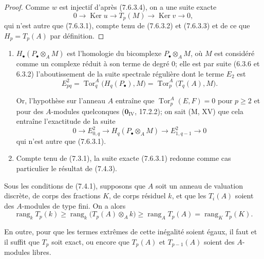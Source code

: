 \begin{proof}
Comme $w$ est injectif d'après (7.6.3.4), on a une suite exacte
\[
  0\longrightarrow\operatorname{Ker}u
  \longrightarrow T_p(M)
  \longrightarrow\operatorname{Ker}v
  \longrightarrow0,
\]
qui n'est autre que (7.6.3.1), compte tenu de (7.6.3.2) et (7.6.3.3) et de ce
que $H_p=T_p(A)$ par définition.
\end{proof}

\begin{remarks}[7.6.4]
\begin{enumerate}
  \item[(i)] $H_\bullet(P_\bullet\otimes_A M)$ est l'homologie du bicomplexe
    $P_\bullet\otimes_A M$, où $M$ est considéré comme un complexe réduit à son
    terme de degré 0; elle est par suite (6.3.6 et 6.3.2) l'aboutissement de la
    suite spectrale régulière dont le terme $E_2$ est
    \[
      E^2_{pq}
      =
      \operatorname{Tor}_q^A\bigl(H_q(P_\bullet),M\bigr)
      =
      \operatorname{Tor}_p^A\bigl(T_q(A),M\bigr).
    \]

    Or, l'hypothèse sur l'anneau $A$ entraîne que
    $\operatorname{Tor}_p^A(E,F)=0$ pour $p\geq2$ et pour des $A$-modules
    quelconques ($\mathbf{0}_{\mathrm{IV}}$, 17.2.2); on sait (M, XV) que cela entraîne
    l'exactitude de la suite
    \[
      0\longrightarrow E^2_{0,q}
      \longrightarrow H_q(P_\bullet\otimes_A M)
      \longrightarrow E^2_{1,q-1}
      \longrightarrow0
    \]
    qui n'est autre que (7.6.3.1).
  \item[(ii)] Compte tenu de (7.3.1), la suite exacte (7.6.3.1) redonne comme
    cas particulier le résultat de (7.4.3).
\end{enumerate}
\end{remarks}

\begin{corollary}[7.6.5]
Sous les conditions de \textup{(7.4.1)}, supposons que $A$ soit un anneau de valuation
discrète, de corps des fractions $K$, de corps résiduel $k$, et que les $T_i(A)$
soient des $A$-modules de type fini. On a alors
\[
  \operatorname{rang}_k T_p(k)
  \geq
  \operatorname{rang}_k\bigl(T_p(A)\otimes_A k\bigr)
  \geq
  \operatorname{rang}_A T_p(A)
  =
  \operatorname{rang}_K T_p(K).
  \tag{7.6.5.1}\label{III.7.6.5.1.fr}
\]

En outre, pour que les termes extrêmes de cette inégalité soient égaux, il faut
et il suffit que $T_p$ soit exact, ou encore que $T_p(A)$ et $T_{p-1}(A)$ soient
des $A$-modules libres.
\end{corollary}

